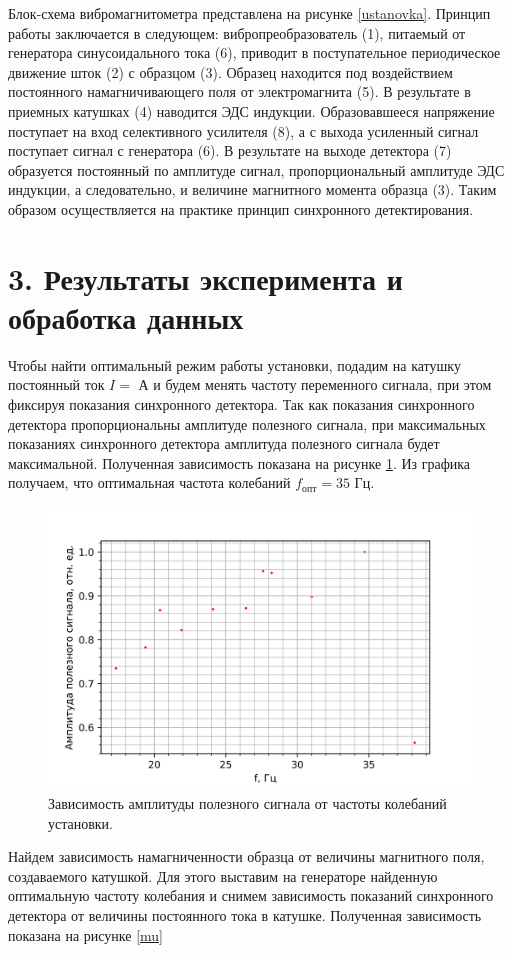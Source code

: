 \documentclass[a4paper,12pt]{report}
\begin{document}
Блок-схема вибромагнитометра представлена на рисунке \ref{ustanovka}. Принцип работы заключается в следующем: вибропреобразователь (1), питаемый от генератора синусоидального тока (6), приводит в поступательное периодическое движение шток (2) с образцом (3). Образец находится под воздействием постоянного намагничивающего поля от электромагнита (5). В результате в приемных катушках (4) наводится ЭДС индукции. Образовавшееся напряжение поступает на вход селективного усилителя (8), а с выхода усиленный сигнал поступает сигнал с генератора (6). В результате на выходе детектора (7) образуется постоянный по амплитуде сигнал, пропорциональный амплитуде ЭДС индукции, а следовательно, и величине магнитного момента образца (3). Таким образом осуществляется на практике принцип синхронного детектирования.

\section*{3. Результаты эксперимента и обработка данных}

Чтобы найти оптимальный режим работы установки, подадим на катушку постоянный ток $I = $ А и будем менять частоту переменного сигнала, при этом фиксируя показания синхронного детектора. Так как показания синхронного детектора пропорциональны амплитуде полезного сигнала, при максимальных показаниях синхронного детектора амплитуда полезного сигнала будет максимальной. Полученная зависимость показана на рисунке \ref{afc}. Из графика получаем, что оптимальная частота колебаний $ f_{опт} = 35$ Гц.

\begin{figure}[H]
    \centering
    \includegraphics[width=0.6\linewidth]{Am(f)_Kate.png}
    \caption{Зависимость амплитуды полезного сигнала от частоты колебаний установки.} \label{afc}
\end{figure}

Найдем зависимость намагниченности образца от величины магнитного поля, создаваемого катушкой. Для этого выставим на генераторе найденную оптимальную частоту колебания и снимем зависимость показаний синхронного детектора от величины постоянного тока в катушке. Полученная зависимость показана на рисунке \ref{mu}
\end{document}
